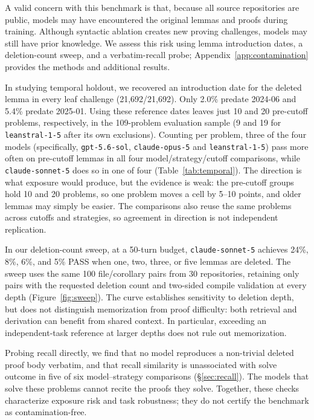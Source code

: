 \documentclass{article}
\begin{document}
A valid concern with this benchmark is that, because all source repositories are public, models may have encountered the original lemmas and proofs during training. Although syntactic ablation creates new proving challenges, models may still have prior knowledge. We assess this risk using lemma introduction dates, a deletion-count sweep, and a verbatim-recall probe; Appendix~\ref{app:contamination} provides the methods and additional results.

In studying temporal holdout, we recovered an introduction date for the deleted lemma in every leaf challenge (21{,}692/21{,}692). Only 2.0\% predate 2024-06 and 5.4\% predate 2025-01. Using these reference dates leaves just 10 and 20 pre-cutoff problems, respectively, in the 109-problem evaluation sample (9 and 19 for \texttt{leanstral-1-5} after its own exclusions). Counting per problem, three of the four models (specifically, \texttt{gpt-5.6-sol}, \texttt{claude-opus-5} and \texttt{leanstral-1-5}) pass more often on pre-cutoff lemmas in all four model/strategy/cutoff comparisons, while \texttt{claude-sonnet-5} does so in one of four (Table~\ref{tab:temporal}). The direction is what exposure would produce, but the evidence is weak: the pre-cutoff groups hold 10 and 20 problems, so one problem moves a cell by 5--10 points, and older lemmas may simply be easier. The comparisons also reuse the same problems across cutoffs and strategies, so agreement in direction is not independent replication.

In our deletion-count sweep, at a 50-turn budget, \texttt{claude-sonnet-5} achieves 24\%, 8\%, 6\%, and 5\% PASS when one, two, three, or five lemmas are deleted. The sweep uses the same 100 file/corollary pairs from 30 repositories, retaining only pairs with the requested deletion count and two-sided compile validation at every depth (Figure~\ref{fig:sweep}). The curve establishes sensitivity to deletion depth, but does not distinguish memorization from proof difficulty: both retrieval and derivation can benefit from shared context. In particular, exceeding an independent-task reference at larger depths does not rule out memorization.

Probing recall directly, we find that no model reproduces a non-trivial deleted proof body verbatim, and that recall similarity is unassociated with solve outcome in five of six model--strategy comparisons (\S\ref{sec:recall}). The models that solve these problems cannot recite the proofs they solve. Together, these checks characterize exposure risk and task robustness; they do not certify the benchmark as contamination-free.
\end{document}
